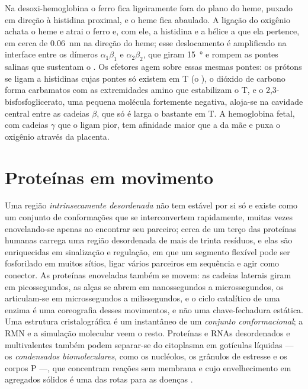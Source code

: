 \begin{proposition}\label{prop:b3:structural-biology:mechanism}
Na desoxi-hemoglobina o ferro fica ligeiramente fora do plano do heme,
puxado em direção à histidina proximal, e o heme fica abaulado. A
ligação do oxigênio achata o heme e atrai o ferro e, com ele, a
histidina e a hélice a que ela pertence, em cerca de \qty{0.06}{nm} na
direção do heme; esse deslocamento é amplificado na interface entre os
dímeros $\alpha_{1}\beta_{1}$ e $\alpha_{2}\beta_{2}$, que giram
\qty{15}{\degree} e rompem as pontes salinas que sustentam o .
Os efetores agem sobre essas mesmas pontes: os prótons se ligam a
histidinas cujas pontes só existem em T (o ), o dióxido de
carbono forma carbamatos com as extremidades amino que estabilizam o T,
e o 2,3-bisfosfoglicerato, uma pequena molécula fortemente negativa,
aloja-se na cavidade central entre as cadeias $\beta$, que só é larga o
bastante em T. A hemoglobina fetal, com cadeias $\gamma$ que o ligam
pior, tem afinidade maior que a da mãe e puxa o oxigênio através da
placenta.
\end{proposition}

\section{Proteínas em movimento}

\begin{definition}\label{def:b3:structural-biology:disorder}
Uma região \emph{intrinsecamente desordenada} não tem 
estável por si só e existe como um conjunto de conformações que se
interconvertem rapidamente, muitas vezes enovelando-se apenas ao
encontrar seu parceiro; cerca de um terço das proteínas humanas carrega
uma região desordenada de mais de trinta resíduos, e elas são
enriquecidas em sinalização e regulação, em que um segmento flexível
pode ser fosforilado em muitos sítios, ligar vários parceiros em
sequência e agir como conector. As proteínas enoveladas também se
movem: as cadeias laterais giram em picossegundos, as alças se abrem em
nanossegundos a microssegundos, os  articulam-se em
microssegundos a milissegundos, e o ciclo catalítico de uma enzima é
uma coreografia desses movimentos, e não uma chave-fechadura estática.
Uma estrutura cristalográfica é um instantâneo de um \emph{conjunto
conformacional}; a RMN e a simulação molecular veem o resto. Proteínas
e RNAs desordenados e multivalentes também podem separar-se do
citoplasma em gotículas líquidas --- os \emph{condensados
biomoleculares}, como os nucléolos, os grânulos de estresse e os corpos
P ---, que concentram reações sem membrana e cujo envelhecimento em
agregados sólidos é uma das rotas para as doenças .
\end{definition}

